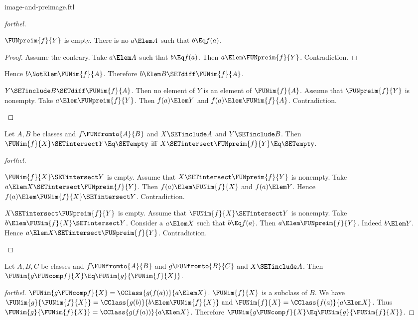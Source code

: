 \documentclass{stex}
\begin{document}
\begin{smodule}{image-and-preimage.ftl}
\begin{proof}[forthel]
\begin{case}{$\FUNpreim{f}{Y}$ is empty.}
    There is no $a \Elem A$ such that $b \Eq f(a)$.
    \begin{proof}
      Assume the contrary.
      Take $a \Elem A$ such that $b \Eq f(a)$.
      Then $a \Elem \FUNpreim{f}{Y}$.
      Contradiction.
    \end{proof}

    Hence $b \NotElem \FUNim{f}{A}$.
    Therefore $b \Elem B \SETdiff \FUNim{f}{A}$.
  \end{case}

  \begin{case}{$Y \SETinclude B \SETdiff \FUNim{f}{A}$.}
    Then no element of $Y$ is an element of $\FUNim{f}{A}$.
    Assume that $\FUNpreim{f}{Y}$ is nonempty.
    Take $a \Elem \FUNpreim{f}{Y}$.
    Then $f(a) \Elem Y$ and $f(a) \Elem \FUNim{f}{A}$.
    Contradiction.
  \end{case}
\end{proof}

\begin{proposition}[forthel,id=FOUNDATIONS_07_6295504988143616]
  Let $A, B$ be classes and $f \FUNfromto{A}{B}$ and $X \SETinclude A$ and $Y \SETinclude B$.
  Then $\FUNim{f}{X} \SETintersect Y \Eq \SETempty$ iff $X \SETintersect \FUNpreim{f}{Y} \Eq \SETempty$.
\end{proposition}
\begin{proof}[forthel]
  \begin{case}{$\FUNim{f}{X} \SETintersect Y$ is empty.}
    Assume that $X \SETintersect \FUNpreim{f}{Y}$ is nonempty.
    Take $a \Elem X \SETintersect \FUNpreim{f}{Y}$.
    Then $f(a) \Elem \FUNim{f}{X}$ and $f(a) \Elem Y$.
    Hence $f(a) \Elem \FUNim{f}{X} \SETintersect Y$.
    Contradiction.
  \end{case}

  \begin{case}{$X \SETintersect \FUNpreim{f}{Y}$ is empty.}
    Assume that $\FUNim{f}{X} \SETintersect Y$ is nonempty.
    Take $b \Elem \FUNim{f}{X} \SETintersect Y$.
    Consider a $a \Elem X$ such that $b \Eq f(a)$.
    Then $a \Elem \FUNpreim{f}{Y}$.
    Indeed $b \Elem Y$.
    Hence $a \Elem X \SETintersect \FUNpreim{f}{Y}$.
    Contradiction.
  \end{case}
\end{proof}

\begin{proposition}[forthel,id=FOUNDATIONS_07_5628919411638272]
  Let $A, B, C$ be classes and $f \FUNfromto{A}{B}$ and $g \FUNfromto{B}{C}$ and $X \SETinclude A$.
  Then $\FUNim{g \FUNcomp f}{X} \Eq \FUNim{g}{\FUNim{f}{X}}$.
\end{proposition}
\begin{proof}[forthel]
  $\FUNim{g \FUNcomp f}{X} = \CClass{g(f(a))}{a \Elem X}$.
  $\FUNim{f}{X}$ is a subclass of $B$.
  We have $\FUNim{g}{\FUNim{f}{X}} = \CClass{g(b)}{b \Elem \FUNim{f}{X}}\text{ and }\FUNim{f}{X} = \CClass{f(a)}{a \Elem X}$.
  Thus $\FUNim{g}{\FUNim{f}{X}} = \CClass{g(f(a))}{a \Elem X}$.
  Therefore $\FUNim{g \FUNcomp f}{X} \Eq \FUNim{g}{\FUNim{f}{X}}$.
\end{proof}


\end{smodule}
\end{document}

